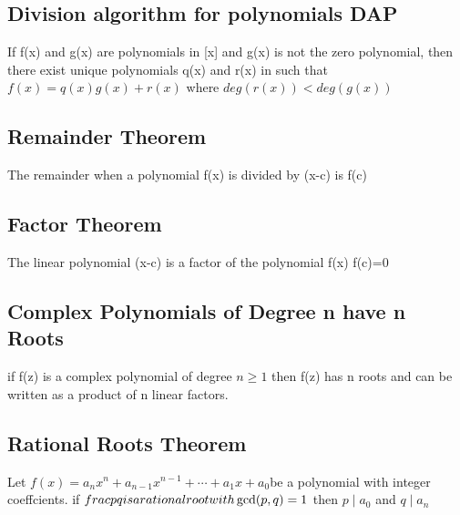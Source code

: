 \documentclass[12pt]{article}
\begin{document}
\subsection{Division algorithm for polynomials DAP}
If f(x) and g(x) are polynomials in [x] and g(x) is not the zero
polynomial, then there exist unique polynomials q(x) and r(x) in 
such that $f(x)=q(x)g(x) +r(x)$ where $deg(r(x))<deg(g(x))$
\subsection{Remainder Theorem}
The remainder when a polynomial f(x) is divided by (x-c) is f(c)
\subsection{Factor Theorem}
The linear polynomial (x-c) is a factor of the polynomial f(x) \iff f(c)=0
\subsection{Complex Polynomials of Degree n have n Roots}
if f(z) is a complex polynomial of degree $n\geq1$ then f(z) has n roots and
can be written as a product of n linear factors.
\subsection{Rational Roots Theorem}
Let $f(x)=a_nx^n+a_{n-1}x^{n-1}+\cdots+a_1x+a_0$be a polynomial with integer
coeffcients. if $\\frac{p}{q} is a rational root with \gcd(p,q)=1$ then
$p\mid a_0$ and $q\mid a_n$
\end{document}
